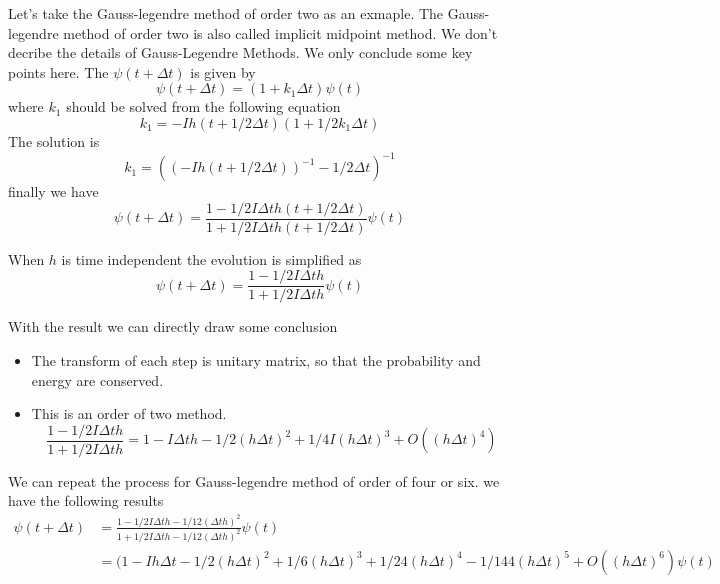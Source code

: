 \documentclass[12pt,twoside]{article}
\begin{document}
Let's take the Gauss-legendre method of order two as an exmaple. The Gauss-legendre method of order two is also called implicit midpoint method.
We don't decribe the details of Gauss-Legendre Methods. We only conclude some key points here.
The $\psi(t+\Delta t)$ is given by
$$
\psi(t+\Delta t) = (1+k_1\Delta t) \psi(t)
$$
where $k_1$ should be solved from the following equation
$$
k_1 = - I h(t+1/2\Delta t) (1 + 1/2 k_1\Delta t)
$$
The solution is
$$
k_1 = ((-I h(t+1/2\Delta t))^{-1} - 1/2 \Delta t)^{-1}
$$
finally we have
$$
\psi(t+\Delta t) = \frac{1 - 1/2 I \Delta t h(t+1/2\Delta t)} {1 + 1/2 I \Delta t h(t+1/2\Delta t)} \psi(t)
$$

When $h$ is time independent the evolution is simplified as
$$
\psi(t + \Delta t) = \frac{1 - 1/2 I \Delta t h} {1 + 1/2 I \Delta t h} \psi(t)
$$

With the result we can directly draw some conclusion

\begin{itemize}
  \item The transform of each step is unitary matrix, so that the probability and energy are conserved.
  \item This is an order of two method.
$$
\frac{1 - 1/2 I \Delta t h} {1 + 1/2 I \Delta t h}
= 1- I \Delta t h - 1/2(h\Delta t)^2+ 1/4 I(h\Delta t)^3 + O((h\Delta t)^4)
$$
\end{itemize}

We can repeat the process for Gauss-legendre method of order of four or six. we have the following results
\begin{align*}
\psi(t + \Delta t) &= \frac{1 - 1/2 I \Delta t h - 1/12 (\Delta t h)^2}{ 1 + 1/2 I \Delta t h - 1/12 (\Delta t h)^2} \psi(t)\\
&=(1 - I h \Delta t - 1/2 (h \Delta t)^2 + 1/6 (h \Delta t)^3 + 1/24(h \Delta t)^4 - 1/144(h \Delta t)^5 + O((h \Delta t)^6)\psi(t)
\end{align*}
\end{document}
